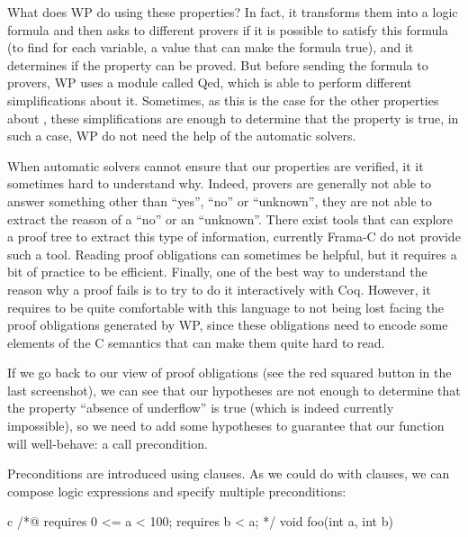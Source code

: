 What does WP do using these properties? In fact, it transforms them
into a logic formula and then asks to different provers if it is
possible to satisfy this formula (to find for each variable, a value
that can make the formula true), and it determines if the property can
be proved. But before sending the formula to provers, WP uses a module
called Qed, which is able to perform different simplifications about it.
Sometimes, as this is the case for the other properties about
, these simplifications are enough to determine that the
property is true, in such a case, WP do not need the help of the
automatic solvers.



When automatic solvers cannot ensure that our properties are verified,
it it sometimes hard to understand why. Indeed, provers are generally
not able to answer something other than ``yes'', ``no'' or ``unknown'',
they are not able to extract the reason of a ``no'' or an ``unknown''.
There exist tools that can explore a proof tree to extract this type of
information, currently Frama-C do not provide such a tool. Reading proof
obligations can sometimes be helpful, but it requires a bit of practice
to be efficient. Finally, one of the best way to understand the reason
why a proof fails is to try to do it interactively with Coq. However, it
requires to be quite comfortable with this language to not being lost
facing the proof obligations generated by WP, since these obligations
need to encode some elements of the C semantics that can make them quite
hard to read.



If we go back to our view of proof obligations (see the red squared button
in the last screenshot), we can see that our hypotheses are not enough
to determine that the property ``absence of underflow'' is true (which
is indeed currently impossible), so we need to add some hypotheses to
guarantee that our function will well-behave: a call precondition.






Preconditions are introduced using  clauses. As we
could do with  clauses, we can compose logic expressions
and specify multiple preconditions:



\begin{CodeBlock}{c}
/*@
  requires 0 <= a < 100;
  requires b < a;
*/
void foo(int a, int b){
  
}
\end{CodeBlock}



